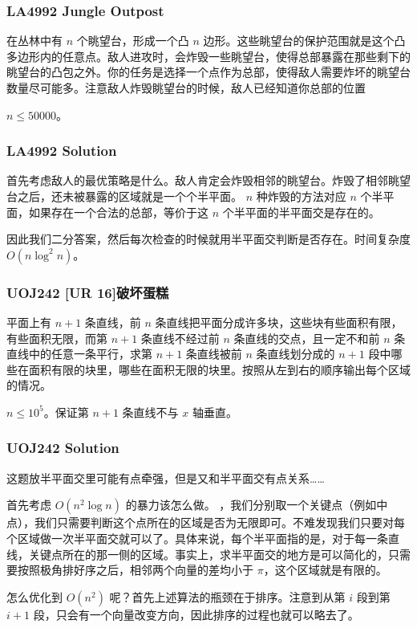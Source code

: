 \documentclass[10pt]{beamer}
\begin{document}
\begin{CJK}{UTF8}{gkai}
\begin{spacing}{1.2}
\begin{frame}
		\end{frame}
		\begin{frame}
			\frametitle{LA4992 Jungle Outpost}

			在丛林中有 $n$ 个眺望台，形成一个凸 $n$ 边形。这些眺望台的保护范围就是这个凸多边形内的任意点。敌人进攻时，会炸毁一些眺望台，使得总部暴露在那些剩下的眺望台的凸包之外。你的任务是选择一个点作为总部，使得敌人需要炸坏的眺望台数量尽可能多。注意敌人炸毁眺望台的时候，敌人已经知道你总部的位置 \pause

			$n \le 50000$。

		\end{frame}
		\begin{frame}
			\frametitle{LA4992 Solution}

			首先考虑敌人的最优策略是什么。\pause 敌人肯定会炸毁相邻的眺望台。炸毁了相邻眺望台之后，还未被暴露的区域就是一个个半平面。 $n$ 种炸毁的方法对应 $n$ 个半平面，如果存在一个合法的总部，等价于这 $n$ 个半平面的半平面交是存在的。\pause

			因此我们二分答案，然后每次检查的时候就用半平面交判断是否存在。时间复杂度 $O(n \log^2 n)$。

		\end{frame}
		\begin{frame}
			\frametitle{UOJ242 [UR 16]破坏蛋糕}
			
			平面上有 $n + 1$ 条直线，前 $n$ 条直线把平面分成许多块，这些块有些面积有限，有些面积无限，而第 $n + 1$ 条直线不经过前 $n$ 条直线的交点，且一定不和前 $n$ 条直线中的任意一条平行，求第 $n + 1$ 条直线被前 $n$ 条直线划分成的 $n + 1$ 段中哪些在面积有限的块里，哪些在面积无限的块里。按照从左到右的顺序输出每个区域的情况。 \pause

			$n \le 10^5$。保证第 $n + 1$ 条直线不与 $x$ 轴垂直。

		\end{frame}
		\begin{frame}
			\frametitle{UOJ242 Solution}

			这题放半平面交里可能有点牵强，但是又和半平面交有点关系…… \pause

			首先考虑 $O(n^2 \log n)$ 的暴力该怎么做。 ，我们分别取一个关键点（例如中点），我们只需要判断这个点所在的区域是否为无限即可。不难发现我们只要对每个区域做一次半平面交就可以了。具体来说，每个半平面指的是，对于每一条直线，关键点所在的那一侧的区域。事实上，求半平面交的地方是可以简化的，只需要按照极角排好序之后，相邻两个向量的差均小于 $\pi$，这个区域就是有限的。 \pause

			怎么优化到 $O(n^2)$ 呢？\pause 首先上述算法的瓶颈在于排序。注意到从第 $i$ 段到第 $i + 1$ 段，只会有一个向量改变方向，因此排序的过程也就可以略去了。


\end{frame}
\end{spacing}
\end{CJK}
\end{document}
